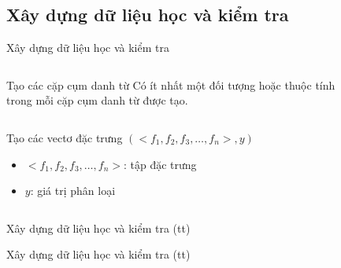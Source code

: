 \documentclass[9pt,xcolor=table,hyperref=unicode]{beamer}
\begin{document}
	\subsection{Xây dựng dữ liệu học và kiểm tra}
	\begin{frame}{Xây dựng dữ liệu học và kiểm tra}				
		\begin{columns}[t]
			\begin{column}{0.4\textwidth}
			   	\begin{block}{Tạo các cặp cụm danh từ}
					Có ít nhất một đối tượng hoặc thuộc tính trong mỗi cặp cụm danh từ được tạo.
				\end{block}
			\end{column}
			\begin{column}{0.6\textwidth}  %
			 	\begin{figure}[H]
					\LARGE 
					\centering				
					\resizebox{65mm}{!}{}	
				\end{figure}
			\end{column}
		\end{columns}
		\begin{columns}[t]
			\begin{column}{\textwidth}
			   	\begin{block}{Tạo các vectơ đặc trưng}										
					$(<f_{1},f_{2},f_{3},…,f_{n}>, y)$
					\begin{itemize}
						\item{$<f_{1},f_{2},f_{3},…,f_{n}>$: tập đặc trưng}
						\item{$y$: giá trị phân loại}										
					\end{itemize}
				\end{block}					
			\end{column}			
		\end{columns}
	\end{frame}	

	\begin{frame}{Xây dựng dữ liệu học và kiểm tra (tt)}		
		\begin{table}[]		
		\parbox{\textwidth}{
			\centering			
			\fontsize{6pt}{7}\selectfont		
				
			\caption{Các đặc trưng được sử dụng trong hệ thống}
		}
		\end{table}
	\end{frame}	

	\begin{frame}{Xây dựng dữ liệu học và kiểm tra (tt)}		
		\begin{table}[]		
		\parbox{\textwidth}{
			\centering
			\fontsize{6pt}{7}\selectfont			
				
			\caption{Các đặc trưng được sử dụng trong hệ thống (tt)}
		}
		\end{table}
	\end{frame}
\end{document}
